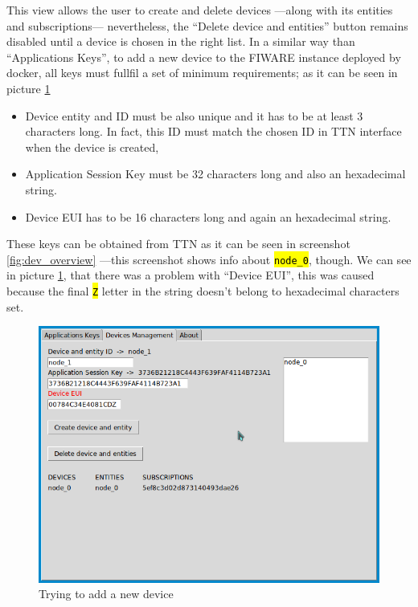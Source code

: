\documentclass[11pt,a4paper,dvipsnames,twoside]{article}
\newcommand{\cmd}[1] {\hl{\texttt{#1}}}
\begin{document}
This view allows the user to create and delete devices ---along with its entities and subscriptions--- nevertheless, the \enquote{Delete device and entities} button remains disabled until a device is chosen in the right list. In a similar way than \enquote{Applications Keys}, to add a new device to the FIWARE instance deployed by docker, all keys must fullfil a set of minimum requirements; as it can be seen in picture \ref{fig:adding_dev}

\begin{itemize}
  \item Device entity and ID must be also unique and it has to be at least 3 characters long. In fact, this ID must match the chosen ID in TTN interface when the device is created,
  \item Application Session Key must be 32 characters long and also an hexadecimal string.
  \item Device EUI has to be 16 characters long and again an hexadecimal string.
\end{itemize}

These keys can be obtained from TTN as it can be seen in screenshot \ref{fig:dev_overview} ---this screenshot shows info about \cmd{node\_0}, though. We can see in picture \ref{fig:adding_dev}, that there was a problem with \enquote{Device EUI}, this was caused because the final \cmd{Z} letter in the string doesn't belong to hexadecimal characters set.

\begin{figure}[htp]
  \centering
  \includegraphics[width=.9\textwidth]{../pictures/GUI_add_device.png}
  \caption{Trying to add a new device}
  \label{fig:adding_dev}
\end{figure}
\end{document}
